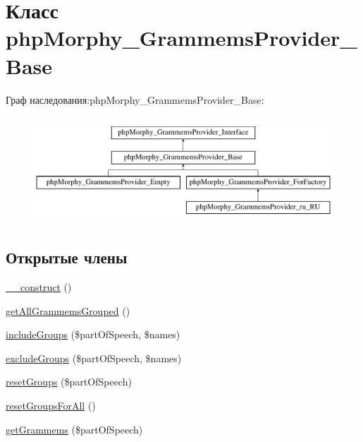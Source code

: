 \hypertarget{classphpMorphy__GrammemsProvider__Base}{
\section{Класс phpMorphy\_\-GrammemsProvider\_\-Base}
\label{classphpMorphy__GrammemsProvider__Base}
}
Граф наследования:phpMorphy\_\-GrammemsProvider\_\-Base:\begin{figure}[H]
\begin{center}
\leavevmode
\includegraphics[height=4.000000cm]{classphpMorphy__GrammemsProvider__Base}
\end{center}
\end{figure}
\subsection*{Открытые члены}
\begin{DoxyCompactItemize}
\item 
\hyperlink{classphpMorphy__GrammemsProvider__Base_a89cb7827bd5b4bce944fd285a9d31aa2}{\_\-\_\-construct} ()
\item 
\hyperlink{classphpMorphy__GrammemsProvider__Base_aaf3e8664b057e3625dd3e5e48bc0d356}{getAllGrammemsGrouped} ()
\item 
\hyperlink{classphpMorphy__GrammemsProvider__Base_afb947a5c04a4d60102c805c7cba4ab0e}{includeGroups} (\$partOfSpeech, \$names)
\item 
\hyperlink{classphpMorphy__GrammemsProvider__Base_a5fd716bdecba814e8e38feba001b5858}{excludeGroups} (\$partOfSpeech, \$names)
\item 
\hyperlink{classphpMorphy__GrammemsProvider__Base_a9725bdbafe347a11efb50d0c78cd10ec}{resetGroups} (\$partOfSpeech)
\item 
\hyperlink{classphpMorphy__GrammemsProvider__Base_a492a1deeb6ff97bc3a75ad187561f08a}{resetGroupsForAll} ()
\item 
\hyperlink{classphpMorphy__GrammemsProvider__Base_af60eb9754a5f62eabe3cb9ce1a27a090}{getGrammems} (\$partOfSpeech)
\end{DoxyCompactItemize}
